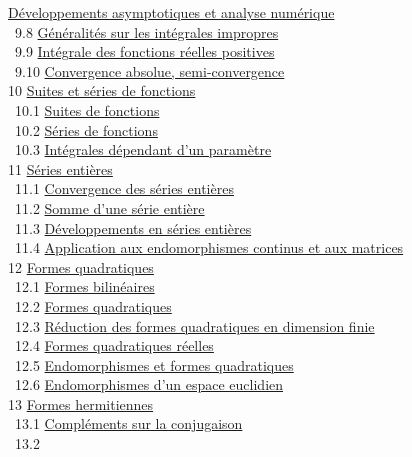 \documentclass[]{article}
\begin{document}
\href{coursse56.html\#x68-2980009.7}{Développements asymptotiques et
analyse numérique} \\ ~9.8
\href{coursse57.html\#x69-3020009.8}{Généralités sur les intégrales
impropres} \\ ~9.9 \href{coursse58.html\#x70-3070009.9}{Intégrale des
fonctions réelles positives} \\ ~9.10
\href{coursse59.html\#x71-3110009.10}{Convergence absolue,
semi-convergence} \\ 10 \href{coursch11.html\#x72-31600010}{Suites et
séries de fonctions} \\ ~10.1
\href{coursse60.html\#x73-31700010.1}{Suites de fonctions} \\ ~10.2
\href{coursse61.html\#x74-32500010.2}{Séries de fonctions} \\ ~10.3
\href{coursse62.html\#x75-33000010.3}{Intégrales dépendant d'un
paramètre} \\ 11 \href{coursch12.html\#x76-33900011}{Séries entières} \\
~11.1 \href{coursse63.html\#x77-34000011.1}{Convergence des séries
entières} \\ ~11.2 \href{coursse64.html\#x78-34500011.2}{Somme d'une
série entière} \\ ~11.3
\href{coursse65.html\#x79-34900011.3}{Développements en séries entières}
\\ ~11.4 \href{coursse66.html\#x80-35800011.4}{Application aux
endomorphismes continus et aux matrices} \\ 12
\href{coursch13.html\#x81-36200012}{Formes quadratiques} \\ ~12.1
\href{coursse67.html\#x82-36300012.1}{Formes bilinéaires} \\ ~12.2
\href{coursse68.html\#x83-37100012.2}{Formes quadratiques} \\ ~12.3
\href{coursse69.html\#x84-37500012.3}{Réduction des formes quadratiques
en dimension finie} \\ ~12.4
\href{coursse70.html\#x85-37800012.4}{Formes quadratiques réelles} \\
~12.5 \href{coursse71.html\#x86-38600012.5}{Endomorphismes et formes
quadratiques} \\ ~12.6
\href{coursse72.html\#x87-39200012.6}{Endomorphismes d'un espace
euclidien} \\ 13 \href{coursch14.html\#x88-40000013}{Formes
hermitiennes} \\ ~13.1 \href{coursse73.html\#x89-40100013.1}{Compléments
sur la conjugaison} \\ ~13.2
\end{document}
